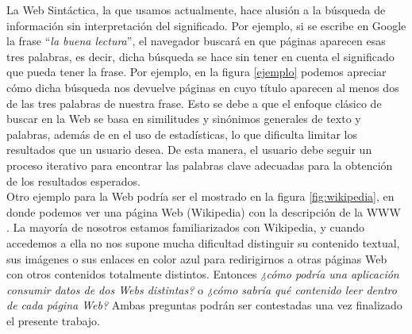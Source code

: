 






La Web Sintáctica, la que usamos actualmente, hace alusión a la búsqueda de información sin interpretación del significado. Por ejemplo, si se escribe en Google la frase ``\textit{la buena lectura}'', el navegador buscará en que páginas aparecen esas tres palabras, es decir, dicha búsqueda se hace sin tener en cuenta el significado que pueda tener la frase. Por ejemplo, en la figura \ref{ejemplo} podemos apreciar cómo dicha búsqueda nos devuelve páginas en cuyo título aparecen al menos dos de las tres palabras de nuestra frase. Esto se debe a que el enfoque clásico de buscar en la Web se basa en similitudes y sinónimos generales de texto y palabras, además de en el uso de estadísticas, lo que dificulta limitar los resultados que un usuario desea. De esta manera, el usuario debe seguir un proceso iterativo para encontrar las palabras clave adecuadas para la obtención de los resultados esperados.\\



Otro ejemplo para la Web podría ser el mostrado en la figura \ref{fig:wikipedia}, en donde podemos ver una página Web (Wikipedia) con la descripción de la WWW \cite{coursera}. La mayoría de nosotros estamos familiarizados con Wikipedia, y cuando accedemos a ella no nos supone mucha dificultad distinguir su contenido textual, sus imágenes o sus enlaces en color azul para redirigirnos a otras páginas Web con otros contenidos totalmente distintos. Entonces \textit{¿cómo podría una aplicación consumir datos de dos Webs distintas?} o \textit{¿cómo sabría qué contenido leer dentro de cada página Web?} Ambas preguntas podrán ser contestadas una vez finalizado el presente trabajo.

